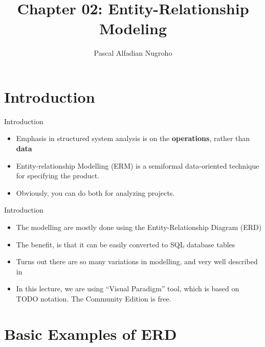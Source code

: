 \documentclass{beamer}
\title{Chapter 02: Entity-Relationship Modeling}
\author[P.A. Nugroho]{Pascal Alfadian Nugroho}
\institute[IF-UNPAR]{Program Studi Informatika, \\Universitas Katolik Parahyangan}
\begin{document}
	\begin{frame}
		\titlepage
	\end{frame}

	\section{Introduction}
	\begin{frame}{Introduction}
		\begin{itemize}
			\item Emphasis in structured system analysis is on the \textbf{operations}, rather than \textbf{data}
            \item Entity-relationship Modelling (ERM) is a semiformal data-oriented technique for specifying the product.
            \item Obviously, you can do both for analyzing projects.
		\end{itemize}
	\end{frame}
	\begin{frame}{Introduction}
		\begin{itemize}
			\item The modelling are mostly done using the Entity-Relationship Diagram (ERD)
			\item The benefit, is that it can be easily converted to SQL database tables
            \item Turns out there are so many variations in modelling, and very well described in \cite{song1995}
            \item In this lecture, we are using ``Visual Paradigm'' tool, which is based on TODO notation. The Community Edition is free.
		\end{itemize}
	\end{frame}
	
	\section{Basic Examples of ERD}
\end{document}
